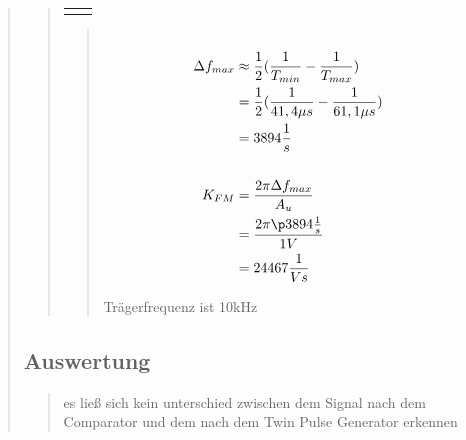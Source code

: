 \begin{quote}
\begin{quote}
\begin{center}
\begin{tabular}{ll}
\begin{minipage}{0.6\textwidth}
            \end{minipage}
        
        \end{tabular}
        \end{center}
        
        
        \begin{quote}
            
            
            
            
            \begin{equation*}
            \begin{split}
            \\
                \Delta f_{max} &\approx \frac{1}{2} (\frac{1}{T_{min}} - \frac{1}{T_{max}})\\
                               &= \frac{1}{2} (\frac{1}{41,4 \mu s} -\frac{1}{61,1 \mu s})\\
                               &= 3894 \frac{1}{s}\\
            \\
                K_{FM} &=\frac{2 \pi \Delta f_{max}}{A_u}\\
                       &= \frac{2 \pi \p 3894 \frac{1}{s}}{1V}\\
                       &= 24467 \frac{1}{Vs}
            \\
            \end{split}
            \end{equation*}
            
            
            Trägerfrequenz ist 10kHz
            
            
            
        \end{quote}


        
        
        
    \end{quote}
    
    
    
    
    \subsection{Auswertung}
    \begin{quote}
        
        es ließ sich kein unterschied zwischen dem Signal nach dem Comparator und dem nach dem Twin Pulse Generator erkennen
        
    \end{quote}
    
\end{quote}



